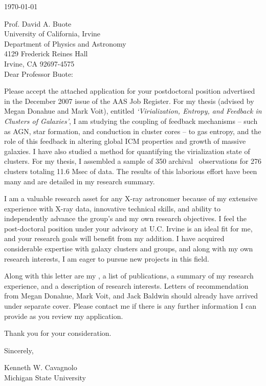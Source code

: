 \documentclass[12pt]{article}
\begin{document}
\today

Prof. David A. Buote\\
University of California, Irvine\\
Department of Physics and Astronomy\\
4129 Frederick Reines Hall\\
Irvine, CA 92697-4575\\

Dear Professor Buote:

Please accept the attached application for your postdoctoral
position advertised in the December 2007 issue of the AAS Job
Register. For my thesis (advised by Megan Donahue and Mark Voit),
entitled {\it `Virialization, Entropy, and Feedback in Clusters of
Galaxies'}, I am studying the coupling of feedback mechanisms -- such
as AGN, star formation, and conduction in cluster cores -- to gas
entropy, and the role of this feedback in altering global ICM
properties and growth of massive galaxies. I have also studied a
method for quantifying the virialization state of clusters. For my
thesis, I assembled a sample of 350 archival \Chandra\ observations
for 276 clusters totaling 11.6 Msec of data. The results of this
laborious effort have been many and are detailed in my research
summary.

I am a valuable research asset for any X-ray astronomer because of my
extensive experience with X-ray data, innovative technical skills, and
ability to independently advance the group's and my own research
objectives. I feel the post-doctoral position under your advisory at
U.C. Irvine is an ideal fit for me, and your research goals will benefit
from my addition. I have acquired considerable expertise with galaxy
clusters and groups, and along with my own research interests, I am
eager to pursue new projects in this field.

Along with this letter are my \cv, a list of publications, a summary of
my research experience, and a description of research interests. Letters of
recommendation from Megan Donahue, Mark Voit, and Jack Baldwin should
already have arrived under separate cover. Please contact me if there
is any further information I can provide as you review my application.

Thank you for your consideration.

Sincerely,\\
\begin{minipage}{7.5in}
\end{minipage}
Kenneth W. Cavagnolo\\
Michigan State University
\end{document}
